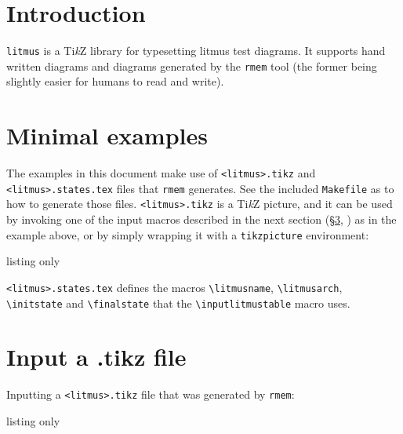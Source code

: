 \documentclass[a4paper]{article}
\newcommand{\TikZ}{Ti\textit{k}Z}
\begin{document}
\section{Introduction}

\verb|litmus| is a \TikZ{} library for typesetting litmus test diagrams.
It supports hand written diagrams and diagrams generated by the
\texttt{rmem} tool (the former being slightly easier for humans to read
and write).


\section{Minimal examples}

The examples in this document make use of \verb|<litmus>.tikz| and
\verb|<litmus>.states.tex| files that \texttt{rmem} generates. See the
included \verb|Makefile| as to how to generate those files.
\verb|<litmus>.tikz| is a \TikZ{} picture, and it can be used by
invoking one of the input macros described in the next section
(\S\ref{sec:inputs}, ) as in the example above, or
by simply wrapping it with a \lstinline|tikzpicture| environment:
\begin{tcblisting}{listing only}%
\begin{tikzpicture}[/litmus/kind=events,/litmus/AArch64]
  
\end{tikzpicture}
\end{tcblisting}
\vspace{2ex}

\verb|<litmus>.states.tex| defines the macros \lstinline+\litmusname+,
\lstinline+\litmusarch+, \lstinline+\initstate+ and \lstinline+\finalstate+
that the \lstinline+\inputlitmustable+ macro uses.



\section{Input a .tikz file}\label{sec:inputs}

Inputting a \verb|<litmus>.tikz| file that was generated by \texttt{rmem}:
\begin{tcblisting}{listing only}



\end{tcblisting}
\end{document}
